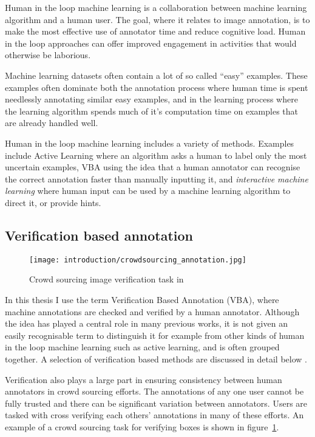 Human in the loop machine learning is a collaboration between machine learning algorithm and a human user. The goal, where it relates to image annotation, is to make the most effective use of annotator time and reduce cognitive load. Human in the loop approaches can offer improved engagement in activities that would otherwise be laborious.

Machine learning datasets often contain a lot of so called ``easy'' examples. These examples often dominate both the annotation process where human time is spent needlessly annotating similar easy examples, and in the learning process where the learning algorithm spends much of it's computation time on examples that are already handled well. 

Human in the loop machine learning includes a variety of methods. Examples include Active Learning where an algorithm asks a human to label only the most uncertain examples, \gls{VBA} using the idea that a human annotator can recognise the correct annotation faster than manually inputting it, and \emph{interactive machine learning} where human input can be used by a machine learning algorithm to direct it, or provide hints. 

\subsection{Verification based annotation}

\begin{figure}[h]
  \centering
  \texttt{[image: introduction/crowdsourcing\_annotation.jpg]}
  \caption{Crowd sourcing image verification task in \cite{Su2012a}} 
  \label{fig:crowdsourcing}
\end{figure}

In this thesis I use the term Verification Based Annotation (VBA), where machine annotations are checked and verified by a human annotator. Although the idea has played a central role in many previous works, it is not given an easily recognisable term to distinguish it for example from other kinds of human in the loop machine learning such as active learning, and is often grouped together. A selection of verification based methods are discussed in detail below \cite{Yao2012, McNeill2011, Adhikaria2018, Castrejon2017, Papadopoulos2016, Russakovsky2015a}. 

Verification also plays a large part in ensuring consistency between human annotators in crowd sourcing efforts. The annotations of any one user cannot be fully trusted and there can be significant variation between annotators. Users are tasked with cross verifying each others' annotations in many of these efforts. An example of a crowd sourcing task \cite{Su2012a} for verifying boxes is shown in figure~\ref{fig:crowdsourcing}.

